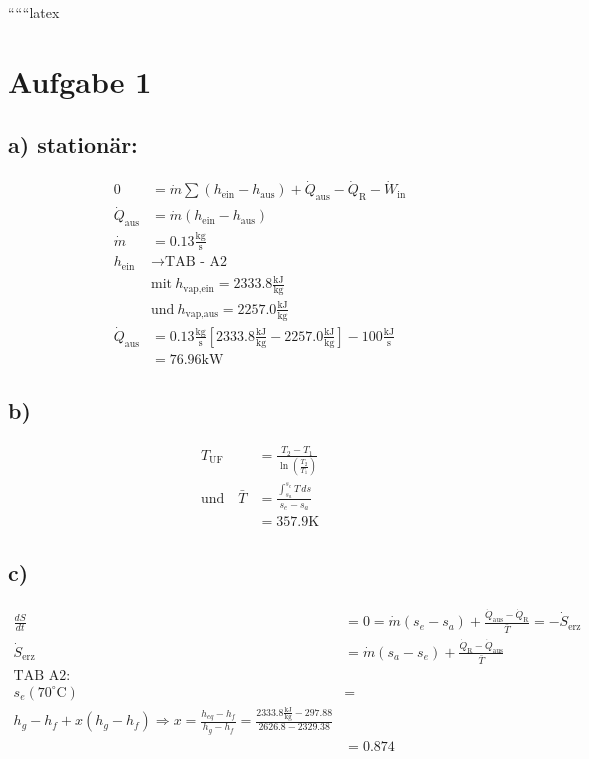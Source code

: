 
``````latex

\section*{Aufgabe 1}

\subsection*{a) stationär:}

\begin{align*}
0 &= \dot{m} \sum (h_{\text{ein}} - h_{\text{aus}}) + \dot{Q}_{\text{aus}} - \dot{Q}_{\text{R}} - \dot{W}_{\text{in}} \\
\dot{Q}_{\text{aus}} &= \dot{m} (h_{\text{ein}} - h_{\text{aus}}) \\
\dot{m} &= 0.13 \frac{\text{kg}}{\text{s}} \\
h_{\text{ein}} &\rightarrow \text{TAB - A2} \\
&\text{mit} \ h_{\text{vap,ein}} = 2333.8 \frac{\text{kJ}}{\text{kg}} \\
&\text{und} \ h_{\text{vap,aus}} = 2257.0 \frac{\text{kJ}}{\text{kg}} \\
\dot{Q}_{\text{aus}} &= 0.13 \frac{\text{kg}}{\text{s}} \left[ 2333.8 \frac{\text{kJ}}{\text{kg}} - 2257.0 \frac{\text{kJ}}{\text{kg}} \right] - 100 \frac{\text{kJ}}{\text{s}} \\
&= 76.96 \text{kW}
\end{align*}

\subsection*{b)}

\begin{align*}
T_{\text{UF}} &= \frac{T_2 - T_1}{\ln \left( \frac{T_2}{T_1} \right)} \\
\text{und} \quad \bar{T} &= \frac{\int_{s_a}^{s_e} T \, ds}{s_e - s_a} \\
&= 357.9 \text{K}
\end{align*}

\subsection*{c)}

\begin{align*}
\frac{dS}{dt} &= 0 = \dot{m} (s_e - s_a) + \frac{\dot{Q}_{\text{aus}} - \dot{Q}_{\text{R}}}{\bar{T}} = -\dot{S}_{\text{erz}} \\
\dot{S}_{\text{erz}} &= \dot{m} (s_{a} - s_{e}) + \frac{\dot{Q}_{\text{R}} - \dot{Q}_{\text{aus}}}{\bar{T}} \\
\text{TAB A2:} \\
s_{e}(70^\circ \text{C}) &= \\
h_{g} - h_{f} + x (h_{g} - h_{f}) \Rightarrow x = \frac{h_{eq} - h_{f}}{h_{g} - h_{f}} = \frac{2333.8 \frac{\text{kJ}}{\text{kg}} - 297.88}{2626.8 - 2329.38} \\
&= 0.874
\end{align*}

